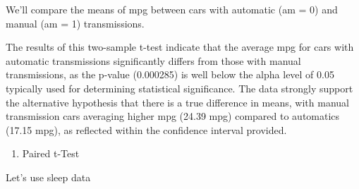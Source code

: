 \documentclass[
]{book}
\newenvironment{Shaded}{\begin{snugshade}}{\end{snugshade}}
\newcommand{\AttributeTok}[1]{\textcolor[rgb]{0.13,0.29,0.53}{#1}}
\newcommand{\CommentTok}[1]{\textcolor[rgb]{0.56,0.35,0.01}{\textit{#1}}}
\newcommand{\ConstantTok}[1]{\textcolor[rgb]{0.56,0.35,0.01}{#1}}
\newcommand{\DecValTok}[1]{\textcolor[rgb]{0.00,0.00,0.81}{#1}}
\newcommand{\FunctionTok}[1]{\textcolor[rgb]{0.13,0.29,0.53}{\textbf{#1}}}
\newcommand{\NormalTok}[1]{#1}
\newcommand{\OtherTok}[1]{\textcolor[rgb]{0.56,0.35,0.01}{#1}}
\newcommand{\SpecialCharTok}[1]{\textcolor[rgb]{0.81,0.36,0.00}{\textbf{#1}}}
\providecommand{\tightlist}{%
  \setlength{\itemsep}{0pt}\setlength{\parskip}{0pt}}
\begin{document}
We'll compare the means of mpg between cars with automatic (am = 0) and manual (am = 1) transmissions.

\begin{Shaded}
\end{Shaded}

The results of this two-sample t-test indicate that the average mpg for cars with automatic transmissions significantly differs from those with manual transmissions, as the p-value (0.000285) is well below the alpha level of 0.05 typically used for determining statistical significance. The data strongly support the alternative hypothesis that there is a true difference in means, with manual transmission cars averaging higher mpg (24.39 mpg) compared to automatics (17.15 mpg), as reflected within the confidence interval provided.

\begin{enumerate}
\def\labelenumi{\alph{enumi}.}
\setcounter{enumi}{2}
\tightlist
\item
  Paired t-Test
\end{enumerate}

Let's use sleep data
\end{document}
